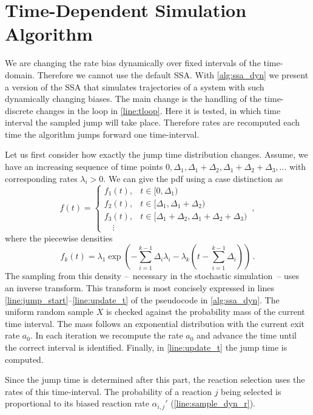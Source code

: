 \section{Time-Dependent Simulation Algorithm}
We are changing the rate bias dynamically over fixed intervals of the time-domain.
Therefore we cannot use the default \ac{SSA}.
With \autoref{alg:ssa_dyn} we present a version of the \acl{SSA} that simulates trajectories of a system with such dynamically changing biases.
The main change is the handling of the time-discrete changes in the loop in \autoref{line:tloop}.
Here it is tested, in which time interval the sampled jump will take place.
Therefore rates are recomputed each time the algorithm jumps forward one time-interval.

Let us first consider how exactly the jump time distribution changes.
Assume, we have an increasing sequence of time points $0, \Delta_1, \Delta_1+\Delta_2,\Delta_1 + \Delta_2+\Delta_3, \dots$ with corresponding rates $\lambda_i >0$.
We can give the pdf using a case distinction as
\begin{equation}
    f(t) = \begin{cases}
        f_1(t), &t\in[0,\Delta_1)\\
        f_2(t), &t\in [\Delta_1,\Delta_1 + \Delta_2)\\
        f_3(t), &t\in [\Delta_1 + \Delta_2,\Delta_1 + \Delta_2 + \Delta_3)\\
        \quad\vdots
    \end{cases}\,,
\end{equation}
where the piecewise densities
\[
    f_k(t) = \lambda_1 \exp \left( -\sum_{i=1}^{k-1}\Delta_i\lambda_i - \lambda_k\left(t - \sum_{i=1}^{k-1} \Delta_i\right)\right)\,.
\]
The sampling from this density --~necessary in the stochastic simulation~-- uses an inverse transform.
This transform is most concisely expressed in lines \ref{line:jump_start}--\ref{line:update_t} of the pseudocode in \autoref{alg:ssa_dyn}.
The uniform random sample $X$ is checked against the probability mass of the current time interval.
The mass follows an exponential distribution with the current exit rate $a_0$.
In each iteration we recompute the rate $a_0$ and advance the time until the correct interval is identified.
Finally, in \autoref{line:update_t} the jump time is computed.

Since the jump time is determined after this part, the reaction selection uses the rates of this time-interval.
The probability of a reaction $j$ being selected is proportional to its biased reaction rate $\alpha_{i,j}'$ (\autoref{line:sample_dyn_r}).

